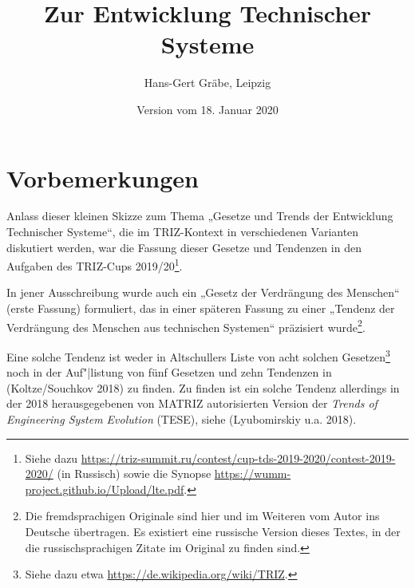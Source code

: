 \documentclass[11pt,a4paper]{article}
\title{Zur Entwicklung Technischer Systeme}
\author{Hans-Gert Gräbe, Leipzig}
\date{Version vom 18. Januar 2020}
\begin{document}
\maketitle

\section{Vorbemerkungen}

Anlass dieser kleinen Skizze zum Thema „Gesetze und Trends der Entwicklung
Technischer Systeme“, die im TRIZ-Kontext in verschiedenen Varianten
diskutiert werden, war die Fassung dieser Gesetze und Tendenzen in den
Aufgaben des TRIZ-Cups 2019/20\footnote{Siehe dazu
  \url{https://triz-summit.ru/contest/cup-tds-2019-2020/contest-2019-2020/}
  (in Russisch) sowie die Synopse
  \url{https://wumm-project.github.io/Upload/lte.pdf}. }.

In jener Ausschreibung wurde auch ein „Gesetz der Verdrängung des Menschen“
(erste Fassung) formuliert, das in einer späteren Fassung zu einer „Tendenz
der Verdrängung des Menschen aus technischen Systemen“ präzisiert
wurde\footnote{Die fremdsprachigen Originale sind hier und im Weiteren vom
  Autor ins Deutsche übertragen. Es existiert eine russische Version dieses
  Textes, in der die russischsprachigen Zitate im Original zu finden sind.}.

Eine solche Tendenz ist weder in Altschullers Liste von acht solchen
Gesetzen\footnote{Siehe dazu etwa \url{https://de.wikipedia.org/wiki/TRIZ}.}
noch in der Auf"|listung von fünf Gesetzen und zehn Tendenzen in
(Koltze/Souchkov 2018) zu finden.  Zu finden ist ein solche Tendenz allerdings
in der 2018 herausgegebenen von MATRIZ autorisierten Version der \emph{Trends
  of Engineering System Evolution} (TESE), siehe (Lyubomirskiy u.a. 2018).
\end{document}
